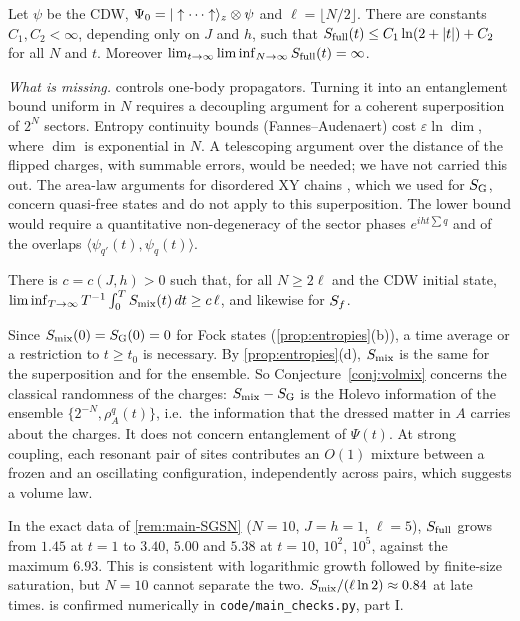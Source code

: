 \begin{conjecture}\label{conj:logent}
Let $\psi$ be the CDW, $\Psi_0=|\uparrow\cdots\uparrow\rangle_z\otimes\psi$ and $\ell=\lfloor N/2\rfloor$.  There are constants
$C_1,C_2<\infty$, depending only on $J$ and $h$, such that $S_{\mathrm{full}}(t)\le C_1\ln(2+|t|)+C_2$ for all $N$ and $t$.  Moreover
$\lim_{t\to\infty}\liminf_{N\to\infty}S_{\mathrm{full}}(t)=\infty$.
\end{conjecture}

\emph{What is missing.}   controls one-body propagators.  Turning it into an entanglement bound uniform in
$N$ requires a decoupling argument for a coherent superposition of $2^N$ sectors.  Entropy continuity bounds
(Fannes--Audenaert) cost $\varepsilon\ln\dim$, where $\dim$ is exponential in $N$.  A telescoping argument over the
distance of the flipped charges, with summable errors, would be needed; we have not carried this out.  The area-law
arguments for disordered XY chains \cite{AbdulRahmanStolz2015,ANSS2016}, which we used for $S_{\mathrm{G}}$, concern quasi-free
states and do not apply to this superposition.  The lower bound would require a quantitative non-degeneracy of the sector phases
$e^{iht\sum q}$ and of the overlaps $\langle\psi_{q'}(t),\psi_q(t)\rangle$.

\begin{conjecture}\label{conj:volmix}
There is $c=c(J,h)>0$ such that, for all $N\ge2\ell$ and the CDW initial state,
$\liminf_{T\to\infty}T^{-1}\int_0^TS_{\mathrm{mix}}(t)\,dt\ge c\,\ell$, and likewise for $S_{f}$.
\end{conjecture}

Since $S_{\mathrm{mix}}(0)=S_{\mathrm{G}}(0)=0$ for Fock states (\cref{prop:entropies}(b)), a time average or a restriction to $t\ge t_0$ is
necessary.  By \cref{prop:entropies}(d), $S_{\mathrm{mix}}$ is the same for the superposition and for the ensemble.  So
Conjecture~\ref{conj:volmix} concerns the classical randomness of the charges: $S_{\mathrm{mix}}-S_{\mathrm{G}}$ is the Holevo information of the ensemble
$\{2^{-N},\rho^q_A(t)\}$, i.e.\ the information that the dressed matter in $A$ carries about the charges.  It does not
concern entanglement of $\Psi(t)$.  At strong coupling, each resonant pair of sites contributes an $O(1)$ mixture between a
frozen and an oscillating configuration, independently across pairs, which suggests a volume law.

\begin{remark}\label{rem:main-conjnum}
In the exact data of \cref{rem:main-SGSN} ($N=10$, $J=h=1$, $\ell=5$), $S_{\mathrm{full}}$ grows from $1.45$ at $t=1$ to $3.40$, $5.00$ and $5.38$
at $t=10$, $10^2$, $10^5$, against the maximum $6.93$.  This is consistent with logarithmic growth followed by
finite-size saturation, but $N=10$ cannot separate the two.  $S_{\mathrm{mix}}/(\ell\ln2)\approx0.84$ at late times.  
is confirmed numerically in \texttt{code/main\_checks.py}, part I.
\end{remark}

